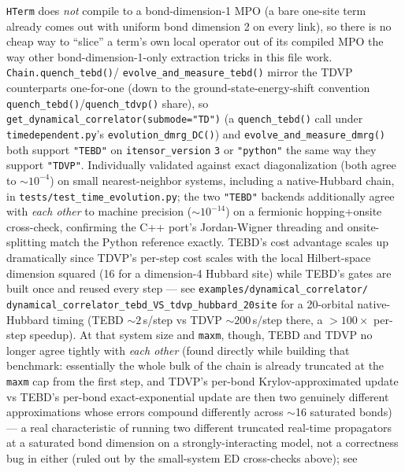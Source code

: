 \documentclass[11pt]{article}
\begin{document}
\begin{itemize}
    \texttt{HTerm} does \emph{not} compile to a bond-dimension-1 MPO (a
    bare one-site term already comes out with uniform bond dimension 2 on
    every link), so there is no cheap way to ``slice'' a term's own local
    operator out of its compiled MPO the way other bond-dimension-1-only
    extraction tricks in this file work. \texttt{Chain.quench\_tebd()}/
    \texttt{evolve\_and\_measure\_tebd()} mirror the TDVP counterparts
    one-for-one (down to the ground-state-energy-shift convention
    \texttt{quench\_tebd()}/\texttt{quench\_tdvp()} share), so
    \texttt{get\_dynamical\_correlator(submode="TD")} (a
    \texttt{quench\_tebd()} call under \texttt{timedependent.py}'s
    \texttt{evolution\_dmrg\_DC()}) and
    \texttt{evolve\_and\_measure\_dmrg()} both support \texttt{"TEBD"} on
    \texttt{itensor\_version} \texttt{3} or \texttt{"python"} the same way
    they support \texttt{"TDVP"}. Individually validated against exact
    diagonalization (both agree to $\sim10^{-4}$) on small
    nearest-neighbor systems, including a native-Hubbard chain, in
    \texttt{tests/test\_time\_evolution.py}; the two \texttt{"TEBD"}
    backends additionally agree with \emph{each other} to machine
    precision ($\sim10^{-14}$) on a fermionic hopping+onsite cross-check,
    confirming the C++ port's Jordan-Wigner threading and onsite-splitting
    match the Python reference exactly. TEBD's cost advantage scales up
    dramatically since TDVP's per-step cost scales with the
    local Hilbert-space dimension squared (16 for a dimension-4 Hubbard
    site) while TEBD's gates are built once and reused every step ---
    see \texttt{examples/dynamical\_correlator/}\allowbreak
    \texttt{dynamical\_correlator\_tebd\_VS\_tdvp\_hubbard\_20site} for a
    20-orbital native-Hubbard timing (TEBD $\sim2\,$s/step vs TDVP
    $\sim200\,$s/step there, a $>100\times$ per-step speedup). At that
    system size and \texttt{maxm}, though, TEBD and TDVP no longer agree
    tightly with \emph{each other} (found directly while building that
    benchmark: essentially the whole bulk of the chain is already
    truncated at the \texttt{maxm} cap from the first step, and TDVP's
    per-bond Krylov-approximated update vs TEBD's per-bond
    exact-exponential update are then two genuinely different
    approximations whose errors compound differently across
    $\sim$16 saturated bonds) --- a real characteristic of running two
    different truncated real-time propagators at a saturated bond
    dimension on a strongly-interacting model, not a correctness bug in
    either (ruled out by the small-system ED cross-checks above); see

\end{itemize}
\end{document}
